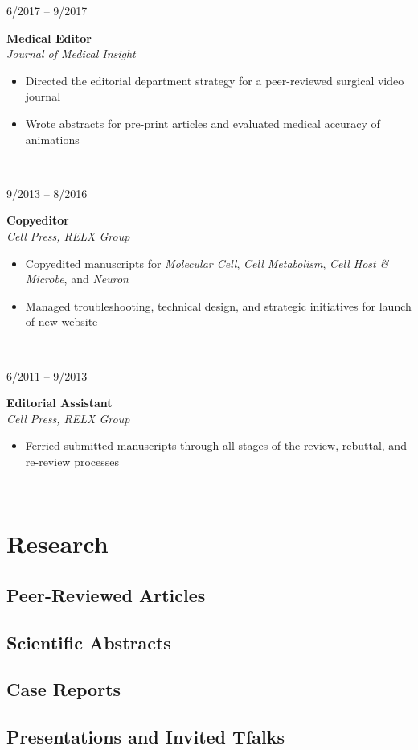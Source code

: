 \documentclass{article}
\newcommand\colleft{.20}
\newcommand\colright{.75}
\newcommand{\entryfour}[4]
	{
		\begin{minipage}[t]{\colleft\textwidth}
		\hfill \textsc{#1}
		\end{minipage}
		\hfill\vline\hfill
		\begin{minipage}[t]{\colright\textwidth}
		{\bf#2}\\
		\textit{#3}
		\footnotesize{#4}
		\end{minipage}\\
		\entryvspace
	}%
\newcommand{\entryvspace}{\vspace{0.5em}}
\begin{document}
		\entryfour{6/2017 -- 9/2017}{Medical Editor}{Journal of Medical Insight}{%
		\begin{itemize}
			\item Directed the editorial department strategy for a peer-reviewed surgical video journal
			\item Wrote abstracts for pre-print articles and evaluated medical accuracy of animations
		\end{itemize}
		}
		
		\entryfour{9/2013 -- 8/2016}{Copyeditor}{Cell Press, RELX Group}{%
			\begin{itemize}
				\item Copyedited manuscripts for \emph{Molecular Cell}, \emph{Cell Metabolism}, \emph{Cell Host \& Microbe}, and \emph{Neuron}
				\item Managed troubleshooting, technical design, and strategic initiatives for launch of new website 
			\end{itemize}
		}
		
		\entryfour{6/2011 -- 9/2013}{Editorial Assistant}{Cell Press, RELX Group}{%
			\begin{itemize}
				\item Ferried submitted manuscripts through all stages of the review, rebuttal, and re-review processes
			\end{itemize}
		}

\section*{Research}
	\nocite{*}
	\subsection*{Peer-Reviewed Articles}
		\printbibliography[keyword=article, heading=none]
	\subsection*{Scientific Abstracts}
		\printbibliography[keyword=abstract, heading=none,resetnumbers]	
	\subsection*{Case Reports}
		\printbibliography[keyword=caseRep, heading=none,resetnumbers]
  \subsection*{Presentations and Invited Tfalks}
	  \printbibliography[keyword=presentation, heading=none, resetnumbers]
\end{document}
